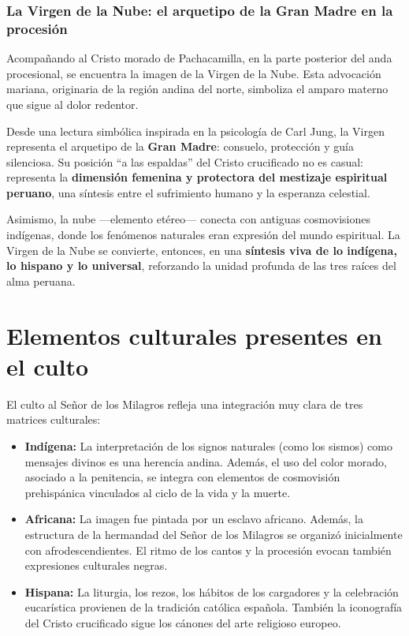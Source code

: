 \documentclass[a4paper,12pt]{article}
\begin{document}
		\subsubsection{La Virgen de la Nube: el arquetipo de la Gran Madre en la procesión}
		
		Acompañando al Cristo morado de Pachacamilla, en la parte posterior del anda procesional, se encuentra la imagen de la Virgen de la Nube. Esta advocación mariana, originaria de la región andina del norte, simboliza el amparo materno que sigue al dolor redentor. 
		
		Desde una lectura simbólica inspirada en la psicología de Carl Jung, la Virgen representa el arquetipo de la \textbf{Gran Madre}: consuelo, protección y guía silenciosa. Su posición “a las espaldas” del Cristo crucificado no es casual: representa la \textbf{dimensión femenina y protectora del mestizaje espiritual peruano}, una síntesis entre el sufrimiento humano y la esperanza celestial.
		
		Asimismo, la nube —elemento etéreo— conecta con antiguas cosmovisiones indígenas, donde los fenómenos naturales eran expresión del mundo espiritual. La Virgen de la Nube se convierte, entonces, en una \textbf{síntesis viva de lo indígena, lo hispano y lo universal}, reforzando la unidad profunda de las tres raíces del alma peruana.
				
		\section{Elementos culturales presentes en el culto}
		El culto al Señor de los Milagros refleja una integración muy clara de tres matrices culturales:
		
		\begin{itemize}
			\item \textbf{Indígena:} La interpretación de los signos naturales (como los sismos) como mensajes divinos es una herencia andina. Además, el uso del color morado, asociado a la penitencia, se integra con elementos de cosmovisión prehispánica vinculados al ciclo de la vida y la muerte.
			
			\item \textbf{Africana:} La imagen fue pintada por un esclavo africano. Además, la estructura de la hermandad del Señor de los Milagros se organizó inicialmente con afrodescendientes. El ritmo de los cantos y la procesión evocan también expresiones culturales negras.
			
			\item \textbf{Hispana:} La liturgia, los rezos, los hábitos de los cargadores y la celebración eucarística provienen de la tradición católica española. También la iconografía del Cristo crucificado sigue los cánones del arte religioso europeo.
		\end{itemize}
		
\end{document}
